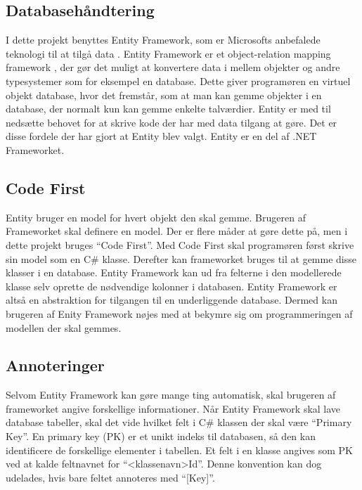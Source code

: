 \subsection{Databasehåndtering}
\label{sec:database}
I dette projekt benyttes Entity Framework, som er Microsofts anbefalede teknologi til at tilgå data \cite{entity}. Entity Framework er et object-relation mapping framework \cite{lerman2010programming}, der gør det muligt at konvertere data i mellem objekter og andre typesystemer som for eksempel en database. Dette giver programøren en virtuel objekt database, hvor det fremstår, som at man kan gemme objekter i en database, der normalt kun kan gemme enkelte talværdier. Entity er med til nedsætte behovet for at skrive kode der har med data tilgang at gøre. Det er disse fordele der har gjort at Entity blev valgt. Entity er en del af .NET Frameworket.


\subsection{Code First}
\label{sub:code_first}
Entity bruger en model for hvert objekt den skal gemme. Brugeren af Frameworket skal definere en model. Der er flere måder at gøre dette på, men i dette projekt bruges \enquote{Code First}. Med Code First skal programøren først skrive sin model som en C\# klasse. Derefter kan frameworket bruges til at gemme disse klasser i en database. Entity Framework kan ud fra felterne i den modellerede klasse selv oprette de nødvendige kolonner i databasen. Entity Framework er altså en abstraktion for tilgangen til en underliggende database. Dermed kan brugeren af Enity Framework nøjes med at bekymre sig om programmeringen af modellen der skal gemmes.

\subsection{Annoteringer}
\label{sub:annoteringer}
Selvom Entity Framework kan gøre mange ting automatisk, skal brugeren af frameworket angive forskellige informationer. Når Entity Framework skal lave database tabeller, skal det vide hvilket felt i C\# klassen der skal være \enquote{Primary Key}. En primary key (PK) er et unikt indeks til databasen, så den kan identificere de forskellige elementer i tabellen. Et felt i en klasse angives som PK ved at kalde feltnavnet for \enquote{<klassenavn>Id}. Denne konvention kan dog udelades, hvis bare feltet annoteres med \enquote{[Key]}.

